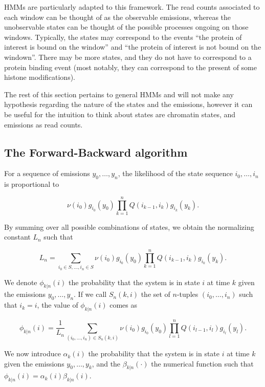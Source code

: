 \documentclass[12pt]{article}
\begin{document}
\begin{appendices}
    HMMs are particularly adapted to this framework. The read counts
    associated to each window can be thought of as the observable
    emissions, whereas the unobservable states can be thought of
    the possible processes ongoing on those windows. Typically, the
    states may correspond to the events ``the protein of interest
    is bound on the window'' and ``the protein of interest is not
    bound on the windown''. There may be more states, and they do
    not have to correspond to a protein binding event (most notably,
    they can correspond to the present of some histone modifications).

    The rest of this section pertains to general HMMs and will not
    make any hypothesis regarding the nature of the states and the
    emissions, however it can be useful for the intuition to think
    about states are chromatin states, and emissions as read counts.

\subsection{The Forward-Backward algorithm}

    For a sequence of emissions $y_0, \ldots, y_n$, the likelihood
    of the state sequence $i_0, \ldots, i_n$ is proportional to

    $$ \nu(i_0)g_{i_0}(y_0)
       \prod_{k=1}^n Q(i_{k-1},i_k)g_{i_k}(y_k). $$

    By summing over all possible combinations of states, we obtain
    the normalizing constant $L_n$ such that

    \begin{equation}
       L_n = \sum_{i_0 \in S, \ldots, i_n \in S} \nu(i_0)g_{i_0}(y_0)
       \prod_{k=1}^n Q(i_{k-1},i_k)g_{i_k}(y_k).
    \end{equation}

    We denote $\phi_{k|n}(i)$ the probability that the system is in
    state $i$ at time $k$ given the emissions $y_0, \ldots, y_n$. If
    we call $S_n(k,i)$ the set of $n$-tuples $(i_0, \ldots, i_n)$
    such that $i_k = i$, the value of $\phi_{k|n}(i)$ comes as

    $$ \phi_{k|n}(i) = \frac{1}{L_n}
       \sum_{(i_0, \ldots, i_n) \in S_n(k,i)}
       \nu(i_0)g_{i_0}(y_0) \prod_{l=1}^n Q(i_{l-1}, i_l)
       g_{i_l}(y_l). $$

    We now introduce $\alpha_k(i)$ the probability that the
    system is in state $i$ at time $k$ given the emissions
    $y_0, \ldots, y_k$, and the $\beta_{k|n}(\cdot)$ the numerical
    function such that $\phi_{k|n}(i) = \alpha_k(i)\beta_{k|n}(i)$.
    

\end{appendices}
\end{document}

